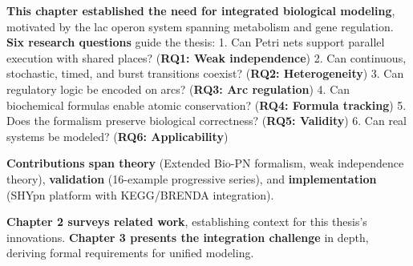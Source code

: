 \textbf{This chapter established the need for integrated biological
modeling}, motivated by the lac operon system spanning metabolism and
gene regulation. \textbf{Six research questions} guide the thesis: 1.
Can Petri nets support parallel execution with shared places?
(\textbf{RQ1: Weak independence}) 2. Can continuous, stochastic, timed,
and burst transitions coexist? (\textbf{RQ2: Heterogeneity}) 3. Can
regulatory logic be encoded on arcs? (\textbf{RQ3: Arc regulation}) 4.
Can biochemical formulas enable atomic conservation? (\textbf{RQ4:
Formula tracking}) 5. Does the formalism preserve biological
correctness? (\textbf{RQ5: Validity}) 6. Can real systems be modeled?
(\textbf{RQ6: Applicability})

\textbf{Contributions span theory} (Extended Bio-PN formalism, weak
independence theory), \textbf{validation} (16-example progressive
series), and \textbf{implementation} (SHYpn platform with KEGG/BRENDA
integration).

\textbf{Chapter 2 surveys related work}, establishing context for this
thesis's innovations. \textbf{Chapter 3 presents the integration
challenge} in depth, deriving formal requirements for unified modeling.
